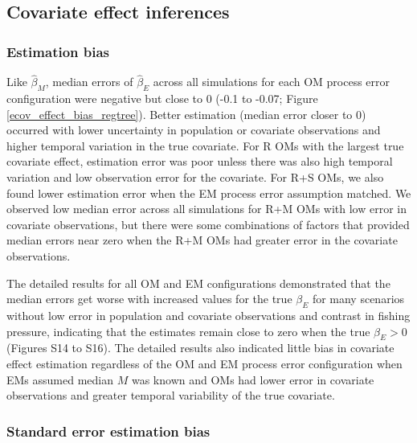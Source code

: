 \documentclass[
  12pt,
]{article}
\begin{document}
\subsection*{Covariate effect
inferences}\label{covariate-effect-inferences}

\subsubsection*{Estimation bias}\label{estimation-bias-1}

Like \(\widehat \beta_M\), median errors of \(\widehat \beta_E\) across
all simulations for each OM process error configuration were negative
but close to 0 (-0.1 to -0.07; Figure \ref{ecov_effect_bias_regtree}).
Better estimation (median error closer to 0) occurred with lower
uncertainty in population or covariate observations and higher temporal
variation in the true covariate. For R OMs with the largest true
covariate effect, estimation error was poor unless there was also high
temporal variation and low observation error for the covariate. For R+S
OMs, we also found lower estimation error when the EM process error
assumption matched. We observed low median error across all simulations
for R+M OMs with low error in covariate observations, but there were
some combinations of factors that provided median errors near zero when
the R+M OMs had greater error in the covariate observations.

The detailed results for all OM and EM configurations demonstrated that
the median errors get worse with increased values for the true
\(\beta_E\) for many scenarios without low error in population and
covariate observations and contrast in fishing pressure, indicating that
the estimates remain close to zero when the true \(\beta_E>0\) (Figures
S14 to S16). The detailed results also indicated little bias in
covariate effect estimation regardless of the OM and EM process error
configuration when EMs assumed median \(M\) was known and OMs had lower
error in covariate observations and greater temporal variability of the
true covariate.

\subsubsection*{Standard error estimation
bias}\label{standard-error-estimation-bias-1}
\end{document}

